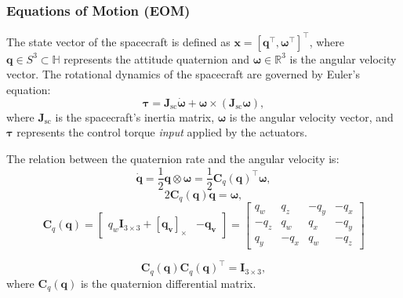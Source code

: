 \subsubsection{Equations of Motion (EOM)}
\label{sec:SC_EOM}
The state vector of the spacecraft is defined as $\mathbf{x} = [\mathbf{q}^\top, \boldsymbol{\omega}^\top]^\top$, 
where $\mathbf{q} \in S^3 \subset \mathbb{H}$ represents the attitude quaternion and $\boldsymbol{\omega} \in \mathbb{R}^3$ is the angular velocity vector.
The rotational dynamics of the spacecraft are governed by Euler's equation:
\begin{equation}
    \boldsymbol{\tau} =
    \mathbf{J}_{\mathrm{sc}}\dot{\boldsymbol{\omega}} + \boldsymbol{\omega} \times (\mathbf{J}_{\mathrm{sc}}\boldsymbol{\omega}),
\label{eq:eulers_eq_of_rigid_rot_dyn}
\end{equation}
where $\mathbf{J}_{\mathrm{sc}}$ is the spacecraft's inertia matrix, $\boldsymbol{\omega}$ is the angular velocity vector, and $\mathbf{\tau}$ represents the control torque \emph{input} applied by the actuators.

The relation between the quaternion rate and the angular velocity is:
\begin{equation}
\dot{\mathbf{q}} 
= 
\frac{1}{2} \mathbf{q} \otimes \boldsymbol{\omega}
= 
    \frac{1}{2} \mathbf{C}_q(\mathbf{q})^\top \boldsymbol{\omega},
\label{eq:quat_rate_from_omega}
\end{equation}
\begin{equation}
2 \mathbf{C}_q(\mathbf{q}) \dot{\mathbf{q}} 
= 
 \boldsymbol{\omega},
\label{eq:omega_from_quat_rate}
\end{equation}
\begin{equation}
\mathbf{C}_q(\mathbf{q}) = 
\begin{bmatrix} 
    q_w \mathbf{I}_{3\times3} + [\mathbf{q_v}]_\times & -\mathbf{q_v} 
\end{bmatrix}
=
\begin{bmatrix}
q_w & q_z & -q_y & -q_x \\
-q_z & q_w & q_x & -q_y \\
q_y & -q_x & q_w & -q_z
\end{bmatrix}
\label{eq:quat_mult_map_matrix_form}
\end{equation}

\begin{equation}
\mathbf{C}_q(\mathbf{q}) \mathbf{C}_q(\mathbf{q})^\top = 
\mathbf{I}_{3\times3},
\label{eq:quat_mult_map_transpose_inv_identity}
\end{equation}
where $\mathbf{C}_q(\mathbf{q})$ is the quaternion differential matrix.

